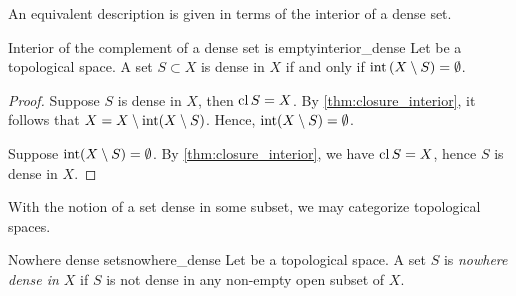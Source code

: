 An equivalent description is given in terms of the interior of a dense set.
\begin{theorem}{Interior of the complement of a dense set is empty}{interior_dense}
    Let  be a topological space. A set \(S\subset X\) is dense in \(X\) if and only if \(\operatorname{int}{(X \setminus S)} = \emptyset\).
\end{theorem}
\begin{proof}
    Suppose \(S\) is dense in \(X\), then \(\operatorname{cl} S = X\). By \cref{thm:closure_interior}, it follows that \(X = X \setminus \operatorname{int}(X\setminus S)\). Hence, \(\operatorname{int}(X\setminus S) = \emptyset\).

    Suppose \(\operatorname{int}(X\setminus S) = \emptyset\). By \cref{thm:closure_interior}, we have \(\operatorname{cl}{S} = X\), hence \(S\) is dense in \(X\).
\end{proof}

With the notion of a set dense in some subset, we may categorize topological spaces.
\begin{definition}{Nowhere dense sets}{nowhere_dense}
    Let  be a topological space. A set \(S\) is \emph{nowhere dense in \(X\)} if \(S\) is not dense in any non-empty open subset of \(X\).
\end{definition}

